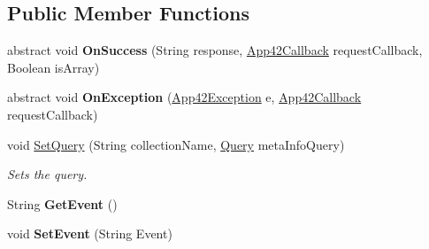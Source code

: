 \subsection*{Public Member Functions}
\begin{DoxyCompactItemize}
\item 
\hypertarget{classcom_1_1shephertz_1_1app42_1_1paas_1_1sdk_1_1windows_1_1_app42_service_a895e80f7ced2390e42301e43321b3d77}{abstract void {\bfseries On\+Success} (String response, \hyperlink{interfacecom_1_1shephertz_1_1app42_1_1paas_1_1sdk_1_1windows_1_1_app42_callback}{App42\+Callback} request\+Callback, Boolean is\+Array)}\label{classcom_1_1shephertz_1_1app42_1_1paas_1_1sdk_1_1windows_1_1_app42_service_a895e80f7ced2390e42301e43321b3d77}

\item 
\hypertarget{classcom_1_1shephertz_1_1app42_1_1paas_1_1sdk_1_1windows_1_1_app42_service_a2538861fd26bc2a454b34e69aecdaf71}{abstract void {\bfseries On\+Exception} (\hyperlink{classcom_1_1shephertz_1_1app42_1_1paas_1_1sdk_1_1windows_1_1_app42_exception}{App42\+Exception} e, \hyperlink{interfacecom_1_1shephertz_1_1app42_1_1paas_1_1sdk_1_1windows_1_1_app42_callback}{App42\+Callback} request\+Callback)}\label{classcom_1_1shephertz_1_1app42_1_1paas_1_1sdk_1_1windows_1_1_app42_service_a2538861fd26bc2a454b34e69aecdaf71}

\item 
void \hyperlink{classcom_1_1shephertz_1_1app42_1_1paas_1_1sdk_1_1windows_1_1_app42_service_a1e18ba93bb741a7acc8be165cd1940aa}{Set\+Query} (String collection\+Name, \hyperlink{classcom_1_1shephertz_1_1app42_1_1paas_1_1sdk_1_1windows_1_1storage_1_1_query}{Query} meta\+Info\+Query)
\begin{DoxyCompactList}\small\item\em Sets the query. \end{DoxyCompactList}\item 
\hypertarget{classcom_1_1shephertz_1_1app42_1_1paas_1_1sdk_1_1windows_1_1_app42_service_a21bac75ba7f839ab2792e1a6be6da134}{String {\bfseries Get\+Event} ()}\label{classcom_1_1shephertz_1_1app42_1_1paas_1_1sdk_1_1windows_1_1_app42_service_a21bac75ba7f839ab2792e1a6be6da134}

\item 
\hypertarget{classcom_1_1shephertz_1_1app42_1_1paas_1_1sdk_1_1windows_1_1_app42_service_abc08afae9fb54d3403ca1dc12edcbbe1}{void {\bfseries Set\+Event} (String Event)}\label{classcom_1_1shephertz_1_1app42_1_1paas_1_1sdk_1_1windows_1_1_app42_service_abc08afae9fb54d3403ca1dc12edcbbe1}


\end{DoxyCompactItemize}
